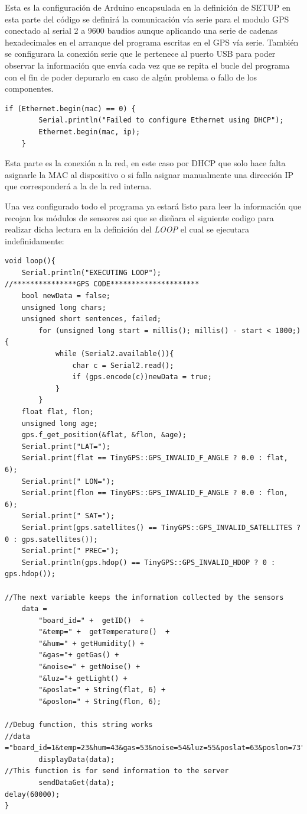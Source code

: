 Esta es la configuración de Arduino encapsulada en la definición de SETUP en esta parte del código se definirá la comunicación vía serie para el modulo GPS conectado al serial 2 a 9600 baudios aunque aplicando una serie de cadenas hexadecimales en el arranque del programa escritas en el GPS vía serie.
También se configurara la conexión serie que le pertenece al puerto USB para poder observar la información que envía cada vez que se repita el bucle del programa con el fin de poder depurarlo en caso de algún problema o fallo de los componentes.\\

\begin{lstlisting}[caption=Conexion a la Red, label=networkcon]
	if (Ethernet.begin(mac) == 0) {
		Serial.println("Failed to configure Ethernet using DHCP");
		Ethernet.begin(mac, ip);
	}
\end{lstlisting}
Esta parte es la conexión a la red, en este caso por DHCP que solo hace falta asignarle la MAC al dispositivo o si falla asignar manualmente una dirección IP que corresponderá a la de la red interna.

Una vez configurado todo el programa ya estará listo para leer la información que recojan los módulos de sensores asi que se dieñara el siguiente codigo para realizar dicha lectura en la definición del \textit{LOOP} el cual se ejecutara indefinidamente:\\

\begin{lstlisting}[caption=Función \textit{LOOP} del código, label=codeloop]
void loop(){
	Serial.println("EXECUTING LOOP");
//***************GPS CODE*********************
	bool newData = false;
	unsigned long chars;
	unsigned short sentences, failed;
		for (unsigned long start = millis(); millis() - start < 1000;){
			while (Serial2.available()){
				char c = Serial2.read();
				if (gps.encode(c))newData = true;
			}
		}
	float flat, flon;
	unsigned long age;
	gps.f_get_position(&flat, &flon, &age);
	Serial.print("LAT=");
	Serial.print(flat == TinyGPS::GPS_INVALID_F_ANGLE ? 0.0 : flat, 6);
	Serial.print(" LON=");
	Serial.print(flon == TinyGPS::GPS_INVALID_F_ANGLE ? 0.0 : flon, 6);
	Serial.print(" SAT=");
	Serial.print(gps.satellites() == TinyGPS::GPS_INVALID_SATELLITES ? 0 : gps.satellites());
	Serial.print(" PREC=");
	Serial.println(gps.hdop() == TinyGPS::GPS_INVALID_HDOP ? 0 : gps.hdop());

//The next variable keeps the information collected by the sensors
	data = 
		"board_id=" +  getID()  +
		"&temp=" +  getTemperature()  + 
		"&hum=" + getHumidity() +
		"&gas="+ getGas() + 
		"&noise=" + getNoise() +
		"&luz="+ getLight() + 
		"&poslat=" + String(flat, 6) + 
		"&poslon=" + String(flon, 6);

//Debug function, this string works
//data ="board_id=1&temp=23&hum=43&gas=53&noise=54&luz=55&poslat=63&poslon=73";
		displayData(data);
//This function is for send information to the server
		sendDataGet(data);
delay(60000);
}
\end{lstlisting}

